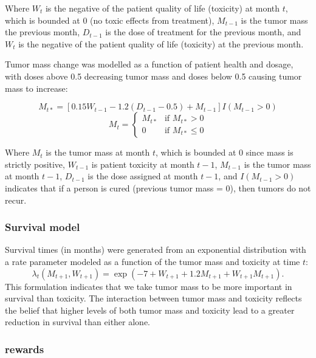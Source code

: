 \documentclass[12pt]{article}
\begin{document}
Where $W_{t}$ is the negative of the patient quality of life (toxicity) at month $t$, which is bounded at 0 (no toxic effects from treatment),
$M_{t-1}$ is the tumor mass the previous month,
$D_{t-1}$ is the dose of treatment for the previous month, and
$W_{t}$ is the negative of the patient quality of life (toxicity) at the previous month.

Tumor mass change was modelled as a function of patient health and dosage, with doses above 0.5 decreasing tumor mass and doses below 0.5 causing tumor mass to increase:

\[
M_{t*} = [0.15 W_{t-1} - 1.2 (D_{t-1} - 0.5) + M_{t - 1}] I(M_{t-1} > 0)
\]
\[
M_{t} = \begin{cases}
  M_{t*} &\text{if } M_{t*} > 0 \\
  0 &\text{if } M_{t*} \leq 0
\end{cases}
\]

Where $M_{t}$ is the tumor mass at month $t$, which is bounded at 0 since mass is strictly positive,
$W_{t-1}$ is patient toxicity at month $t - 1$,
$M_{t-1}$ is the tumor mass at month $t - 1$,
$D_{t-1}$ is the dose assigned at month $t - 1$, and
$I(M_{t-1} > 0)$ indicates that if a person is cured (previous tumor mass = 0), then tumors do not recur.


\subsubsection{Survival model} %
\label{ssub:survival_model}

Survival times (in months) were generated from an exponential distribution with a rate parameter modeled as a function of the tumor mass and toxicity at time $t$:
\[
  \lambda_{t}(M_{t+1}, W_{t+1}) = \exp(-7 + W_{t+1} + 1.2 M_{t+1} + W_{t+1} M_{t+1}).
\]
This formulation indicates that we take tumor mass to be more important in survival than toxicity. The interaction between tumor mass and toxicity reflects the belief that higher levels of both tumor mass and toxicity lead to a greater reduction in survival than either alone.




\subsubsection{rewards} %
\label{sub:}
\end{document}
